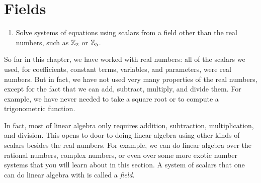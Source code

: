 \section{Fields}
\label{sec:fields}

\begin{outcome}
  \begin{enumerate}
  \item Solve systems of equations using scalars from a field other
    than the real numbers, such as $\mathbb{Z}_2$ or $\mathbb{Z}_5$.
  \end{enumerate}
\end{outcome}

So far in this chapter, we have worked with real numbers: all of the
scalars we used, for coefficients, constant terms, variables, and
parameters, were real numbers. But in fact, we have not used very many
properties of the real numbers, except for the fact that we can add,
subtract, multiply, and divide them. For example, we have never needed
to take a square root or to compute a trigonometric function.

In fact, most of linear algebra only requires addition, subtraction,
multiplication, and division. This opens to door to doing linear
algebra using other kinds of scalars besides the real numbers. For
example, we can do linear algebra over the rational numbers, complex
numbers, or even over some more exotic number systems that you will
learn about in this section. A system of scalars that one can do
linear algebra with is called a {\em field}.


